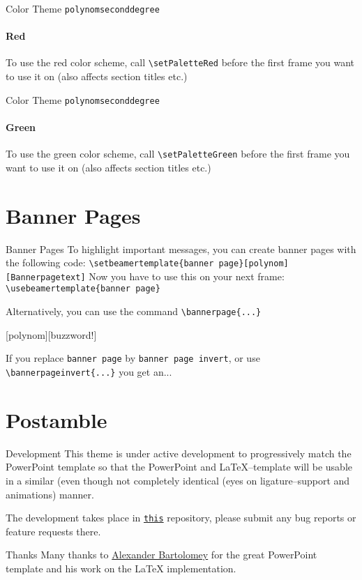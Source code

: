 \documentclass[fragile=singleslide]{beamer}
\begin{document}
\setPaletteRed
\begin{frame}[fragile]{Color Theme \texttt{polynomseconddegree}}
  \framesubtitle{Red}

  To use the red color scheme, call \verb|\setPaletteRed|
  before the first frame you want to use it on (also affects
  section titles etc.)\\
  \paletteColors
  
\end{frame}

\setPaletteGreen
\begin{frame}[fragile]{Color Theme \texttt{polynomseconddegree}}
  \framesubtitle{Green}

  To use the green color scheme, call \verb|\setPaletteGreen|
  before the first frame you want to use it on (also affects
  section titles etc.) \\
  \paletteColors
  
\end{frame}
\setPaletteBlue

\section{Banner Pages}
\begin{frame}[fragile]{Banner Pages}
  To highlight important messages, you can create banner pages with the
  following code:
  \verb|\setbeamertemplate{banner page}[polynom][Bannerpagetext]|
  Now you have to use this on your next frame:
  \verb|\usebeamertemplate{banner page}|

  Alternatively, you can use the command
  \verb|\bannerpage{...}|
\end{frame}

[polynom][buzzword!]
\begin{frame}
\end{frame}

\begin{frame}[fragile]
  If you replace \verb|banner page| by
  \verb|banner page invert|, or use \verb|\bannerpageinvert{...}|
  you get an...
\end{frame}



\section{Postamble}
\begin{frame}{Development}
  This theme is under active development to progressively match the
  PowerPoint template so that the PowerPoint and LaTeX--template will
  be usable in a similar (even though not completely identical (eyes on
  ligature--support and animations) manner.

  The development takes place in
  \href{https://git.rwth-aachen.de/ACHinrichs/LaTeX-templates/}{\texttt{this}}
  repository, please submit any bug reports or feature requests there.
\end{frame}

\begin{frame}{Thanks}
  Many thanks to \href{https://www.occloxium.com/}{Alexander Bartolomey} for 
  the great PowerPoint template and his work on the LaTeX implementation. 
\end{frame}
\end{document}
